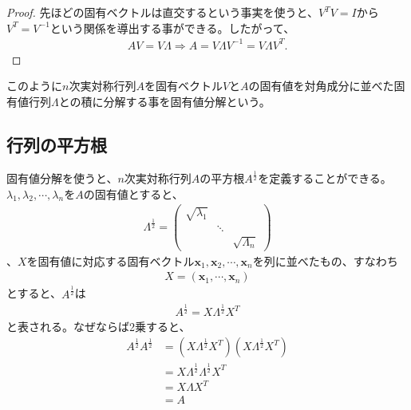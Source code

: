 \begin{proof}
  先ほどの固有ベクトルは直交するという事実を使うと、$V^T V = I$から$V^T = V^{-1}$という関係を導出する事ができる。したがって、
  \begin{align*}
    A V = V \Lambda \Rightarrow A = V \Lambda V^{-1} = V \Lambda V^T.
  \end{align*}
\end{proof}

このように$n$次実対称行列$A$を固有ベクトル$V$と$A$の固有値を対角成分に並べた固有値行列$\Lambda$との積に分解する事を固有値分解という。

\subsection{行列の平方根}
固有値分解を使うと、$n$次実対称行列$A$の平方根$\displaystyle{A^{\frac{1}{2}}}$を定義することができる。$\lambda_1, \lambda_2, \cdots, \lambda_n$を$A$の固有値とすると、
\begin{align*}
  \Lambda^{\frac{1}{2}} = \left(
                            \begin{array}{ccc}
                              \sqrt{\lambda_1} &        & \\
                                               & \ddots & \\
                                               &        & \sqrt{\Lambda_n}
                            \end{array}
                          \right)
\end{align*}
、$X$を固有値に対応する固有ベクトル$\mathbf{x}_1, \mathbf{x}_2, \cdots, \mathbf{x}_n$を列に並べたもの、すなわち
\begin{align*}
  X = \left(\mathbf{x}_1, \cdots, \mathbf{x}_n\right)
\end{align*}
とすると、$A^\frac{1}{2}$は
\begin{align*}
  A^\frac{1}{2} = X \Lambda^{\frac{1}{2}} X^T
\end{align*}
と表される。なぜならば2乗すると、
\begin{align*}
  A^{\frac{1}{2}} A^{\frac{1}{2}} & = \left(X \Lambda^{\frac{1}{2}} X^T\right) \left(X \Lambda^{\frac{1}{2}} X^T\right) \\
                                  & = X \Lambda^{\frac{1}{2}} \Lambda^{\frac{1}{2}} X^T \\
                                  & = X \Lambda X^T \\
                                  & = A
\end{align*}
